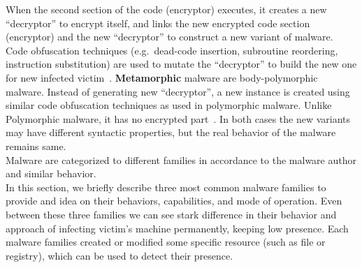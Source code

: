 When the second section of the code (encryptor) executes, it creates a new ``decryptor'' to encrypt itself, and links the new encrypted code section (encryptor) and the new ``decryptor'' to construct a new variant of malware.
Code obfuscation techniques (e.g.\ dead-code insertion, subroutine reordering, instruction substitution) are used to mutate the ``decryptor'' to build the new one for new infected victim~\cite[]{rad2011evolution}.
\textbf{Metamorphic} malware are body-polymorphic malware.
Instead of generating new ``decryptor'', a new instance is created using similar code obfuscation techniques as used in polymorphic malware.
Unlike Polymorphic malware, it has no encrypted part~\cite[]{rad2012camouflage}.
In both cases the new variants may have different syntactic properties, but the real behavior of the malware remains same.\\

Malware are categorized to different families in accordance to the malware author and similar behavior.\\
In this section, we briefly describe three most common malware families to provide and idea on their behaviors, capabilities, and mode of operation.
Even between these three families we can see stark difference in their behavior and approach of infecting victim's machine permanently, keeping low presence.
Each malware families created or modified some specific resource (such as file or registry), which can be used to detect their presence.
